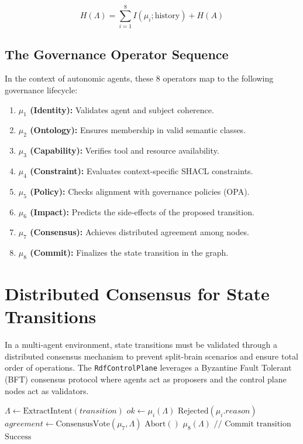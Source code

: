 \begin{equation}
H(\Lambda) = \sum_{i=1}^{8} I(\mu_i; \text{history}) + H(A)
\end{equation}

\subsection{The Governance Operator Sequence}

In the context of autonomic agents, these 8 operators map to the following governance lifecycle:

\begin{enumerate}
    \item \textbf{$\mu_1$ (Identity):} Validates agent and subject coherence.
    \item \textbf{$\mu_2$ (Ontology):} Ensures membership in valid semantic classes.
    \item \textbf{$\mu_3$ (Capability):} Verifies tool and resource availability.
    \item \textbf{$\mu_4$ (Constraint):} Evaluates context-specific SHACL constraints.
    \item \textbf{$\mu_5$ (Policy):} Checks alignment with governance policies (OPA).
    \item \textbf{$\mu_6$ (Impact):} Predicts the side-effects of the proposed transition.
    \item \textbf{$\mu_7$ (Consensus):} Achieves distributed agreement among nodes.
    \item \textbf{$\mu_8$ (Commit):} Finalizes the state transition in the graph.
\end{enumerate}

\section{Distributed Consensus for State Transitions}

In a multi-agent environment, state transitions must be validated through a distributed consensus mechanism to prevent split-brain scenarios and ensure total order of operations. The \texttt{RdfControlPlane} leverages a Byzantine Fault Tolerant (BFT) consensus protocol where agents act as proposers and the control plane nodes act as validators.

\begin{algorithm}
\caption{Distributed Governance Consensus}
\begin{algorithmic}[1]
    \State $\Lambda \gets \text{ExtractIntent}(transition)$
        \State $ok \gets \mu_i(\Lambda)$
         \Return $\text{Rejected}(\mu_i.reason)$ \EndIf
    \EndFor
    \State $agreement \gets \text{ConsensusVote}(\mu_7, \Lambda)$
     \Return $\text{Abort}()$ \EndIf
    \State $\mu_8(\Lambda) \text{ // Commit transition}$
    \State \Return $\text{Success}$
\EndProcedure
\end{algorithmic}
\end{algorithm}

